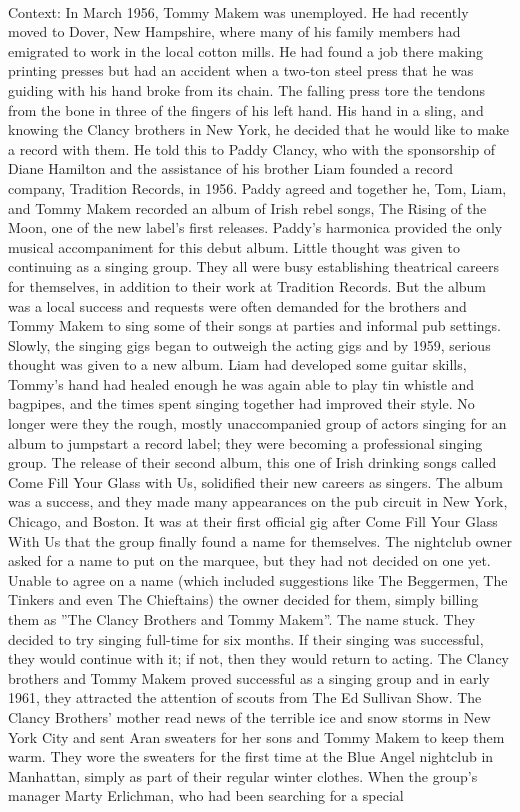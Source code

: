 \documentclass[11pt,a4paper, onecolumn]{article}
\begin{document}
\\ Context: In March 1956, Tommy Makem was unemployed. He had recently moved to Dover, New Hampshire, where many of his family members had emigrated to work in the local cotton mills. He had found a job there making printing presses but had an accident when a two-ton steel press that he was guiding with his hand broke from its chain. The falling press tore the tendons from the bone in three of the fingers of his left hand. His hand in a sling, and knowing the Clancy brothers in New York, he decided that he would like to make a record with them. He told this to Paddy Clancy, who with the sponsorship of Diane Hamilton and the assistance of his brother Liam founded a record company, Tradition Records, in 1956. Paddy agreed and together he, Tom, Liam, and Tommy Makem recorded an album of Irish rebel songs, The Rising of the Moon, one of the new label's first releases. Paddy's harmonica provided the only musical accompaniment for this debut album. Little thought was given to continuing as a singing group. They all were busy establishing theatrical careers for themselves, in addition to their work at Tradition Records. But the album was a local success and requests were often demanded for the brothers and Tommy Makem to sing some of their songs at parties and informal pub settings. Slowly, the singing gigs began to outweigh the acting gigs and by 1959, serious thought was given to a new album. Liam had developed some guitar skills, Tommy's hand had healed enough he was again able to play tin whistle and bagpipes, and the times spent singing together had improved their style. No longer were they the rough, mostly unaccompanied group of actors singing for an album to jumpstart a record label; they were becoming a professional singing group. The release of their second album, this one of Irish drinking songs called Come Fill Your Glass with Us, solidified their new careers as singers. The album was a success, and they made many appearances on the pub circuit in New York, Chicago, and Boston. It was at their first official gig after Come Fill Your Glass With Us that the group finally found a name for themselves. The nightclub owner asked for a name to put on the marquee, but they had not decided on one yet. Unable to agree on a name (which included suggestions like The Beggermen, The Tinkers and even The Chieftains) the owner decided for them, simply billing them as ''The Clancy Brothers and Tommy Makem''. The name stuck. They decided to try singing full-time for six months. If their singing was successful, they would continue with it; if not, then they would return to acting. The Clancy brothers and Tommy Makem proved successful as a singing group and in early 1961, they attracted the attention of scouts from The Ed Sullivan Show. The Clancy Brothers' mother read news of the terrible ice and snow storms in New York City and sent Aran sweaters for her sons and Tommy Makem to keep them warm. They wore the sweaters for the first time at the Blue Angel nightclub in Manhattan, simply as part of their regular winter clothes. When the group's manager Marty Erlichman, who had been searching for a special 
\end{document}
